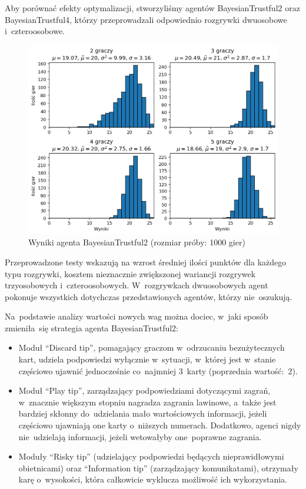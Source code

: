 \documentclass[declaration,shortabstract,inz]{iithesis}
\begin{document}
Aby porównać efekty optymalizacji, stworzyliśmy agentów BayesianTrustful2 oraz BayesianTrustful4, którzy przeprowadzali odpowiednio rozgrywki dwuosobowe i~czteroosobowe.

\begin{figure}[H]
	\centering
	\captionsetup{format=hang}
	\includegraphics[width=\textwidth,height=\textheight,keepaspectratio]{BayesianTrustful2.png}
	\caption[Caption]{Wyniki agenta BayesianTrustful2 (rozmiar próby: 1000 gier)}
	\label{fig:BayesianTrustful2}
\end{figure}

Przeprowadzone testy wskazują na wzrost średniej ilości punktów dla każdego typu rozgrywki, kosztem nieznacznie zwiększonej wariancji rozgrywek trzyosobowych i~czteroosobowych. W~rozgrywkach dwuosobowych agent pokonuje wszystkich dotychczas przedstawionych agentów, którzy nie~oszukują.

Na~podstawie analizy wartości nowych wag można dociec, w~jaki sposób zmieniła~się strategia agenta BayesianTrustful2:

\begin{itemize}
	\item Moduł ``Discard tip'', pomagający graczom w~odrzucaniu bezużytecznych kart, udziela podpowiedzi wyłącznie w~sytuacji, w~której jest w~stanie częściowo ujawnić jednocześnie co~najmniej 3~karty (poprzednia wartość:~2).
	\item Moduł ``Play tip'', zarządzający podpowiedziami dotyczącymi zagrań, w~znacznie większym stopniu nagradza zagrania lawinowe, a~także jest bardziej skłonny do~udzielania mało wartościowych informacji, jeżeli częściowo ujawniają one karty o~niższych numerach. Dodatkowo, agenci nigdy nie~udzielają informacji, jeżeli wetowałyby one~poprawne zagrania.
	\item Moduły ``Risky tip'' (udzielający podpowiedzi będących nieprawidłowymi obietnicami) oraz ``Information tip'' (zarządzający komunikatami), otrzymały karę o~wysokości, która całkowicie wyklucza możliwość ich wykorzystania.
\end{itemize}
\end{document}
